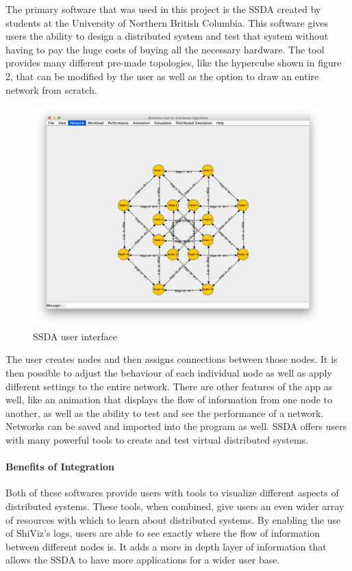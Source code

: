 \documentclass[12pt, oneside]{article}   	%
\begin{document}
The primary software that was used in this project is the SSDA created by students at the University of Northern British Columbia.  This software gives users the ability to design a distributed system and test that system without having to pay the huge costs of buying all the necessary hardware.  The tool provides many different pre-made topologies, like the hypercube shown in figure 2, that can be modified by the user as well as the option to draw an entire network from scratch.  
\begin{figure}[t!!]
\caption{SSDA user interface}
\includegraphics[scale=0.3]{SSDA_Example.png} 
\centering
\end{figure}The user creates nodes and then assigns connections between those nodes.  It is then possible to adjust the behaviour of each individual node as well as apply different settings to the entire network. There are other features of the app as well, like an animation that displays the flow of information from one node to another, as well as the ability to test and see the performance of a network.  Networks can be saved and imported into the program as well.  SSDA offers users with many powerful tools to create and test virtual distributed systems.

\paragraph{Benefits of Integration}

Both of these softwares provide users with tools to visualize different aspects of distributed systems.  These tools, when combined, give users an even wider array of resources with which to learn about distributed systems.  By enabling the use of ShiViz's logs, users are able to see exactly where the flow of information between different nodes is.  It adds a more in depth layer of information that allows the SSDA to have more applications for a wider user base.
\end{document}
